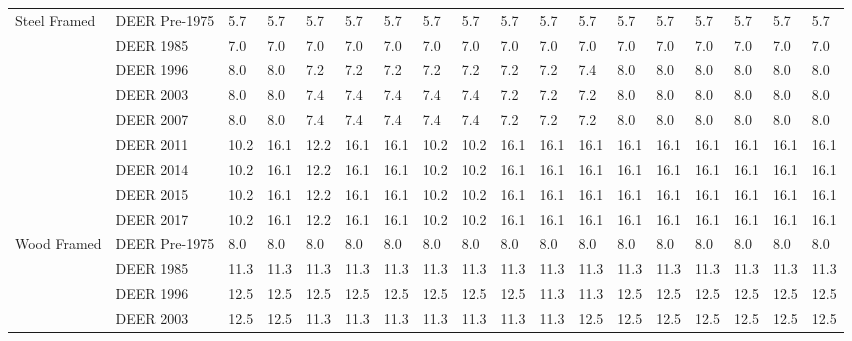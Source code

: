 \begin{table}
\begin{tabular}{p{0.4in}p{0.7in}p{0.1in}p{0.1in}p{0.1in}p{0.1in}p{0.1in}p{0.1in}p{0.1in}p{0.1in}p{0.1in}p{0.1in}p{0.1in}p{0.1in}p{0.1in}p{0.1in}p{0.1in}p{0.1in}}
Steel Framed & DEER Pre-1975 & 5.7  & 5.7  & 5.7  & 5.7  & 5.7  & 5.7  & 5.7  & 5.7  & 5.7  & 5.7  & 5.7  & 5.7  & 5.7  & 5.7  & 5.7  & 5.7                     \\
            & DEER 1985     & 7.0  & 7.0  & 7.0  & 7.0  & 7.0  & 7.0  & 7.0  & 7.0  & 7.0  & 7.0  & 7.0  & 7.0  & 7.0  & 7.0  & 7.0  & 7.0                     \\
            & DEER 1996     & 8.0  & 8.0  & 7.2  & 7.2  & 7.2  & 7.2  & 7.2  & 7.2  & 7.2  & 7.4  & 8.0  & 8.0  & 8.0  & 8.0  & 8.0  & 8.0                     \\
            & DEER 2003     & 8.0  & 8.0  & 7.4  & 7.4  & 7.4  & 7.4  & 7.4  & 7.2  & 7.2  & 7.2  & 8.0  & 8.0  & 8.0  & 8.0  & 8.0  & 8.0                     \\
            & DEER 2007     & 8.0  & 8.0  & 7.4  & 7.4  & 7.4  & 7.4  & 7.4  & 7.2  & 7.2  & 7.2  & 8.0  & 8.0  & 8.0  & 8.0  & 8.0  & 8.0                     \\
            & DEER 2011     & 10.2 & 16.1 & 12.2 & 16.1 & 16.1 & 10.2 & 10.2 & 16.1 & 16.1 & 16.1 & 16.1 & 16.1 & 16.1 & 16.1 & 16.1 & 16.1                    \\
            & DEER 2014     & 10.2 & 16.1 & 12.2 & 16.1 & 16.1 & 10.2 & 10.2 & 16.1 & 16.1 & 16.1 & 16.1 & 16.1 & 16.1 & 16.1 & 16.1 & 16.1                    \\
            & DEER 2015     & 10.2 & 16.1 & 12.2 & 16.1 & 16.1 & 10.2 & 10.2 & 16.1 & 16.1 & 16.1 & 16.1 & 16.1 & 16.1 & 16.1 & 16.1 & 16.1                    \\
            & DEER 2017     & 10.2 & 16.1 & 12.2 & 16.1 & 16.1 & 10.2 & 10.2 & 16.1 & 16.1 & 16.1 & 16.1 & 16.1 & 16.1 & 16.1 & 16.1 & 16.1                    \\
Wood Framed  & DEER Pre-1975 & 8.0  & 8.0  & 8.0  & 8.0  & 8.0  & 8.0  & 8.0  & 8.0  & 8.0  & 8.0  & 8.0  & 8.0  & 8.0  & 8.0  & 8.0  & 8.0                     \\
            & DEER 1985     & 11.3 & 11.3 & 11.3 & 11.3 & 11.3 & 11.3 & 11.3 & 11.3 & 11.3 & 11.3 & 11.3 & 11.3 & 11.3 & 11.3 & 11.3 & 11.3                    \\
            & DEER 1996     & 12.5 & 12.5 & 12.5 & 12.5 & 12.5 & 12.5 & 12.5 & 12.5 & 11.3 & 11.3 & 12.5 & 12.5 & 12.5 & 12.5 & 12.5 & 12.5                    \\
            & DEER 2003     & 12.5 & 12.5 & 11.3 & 11.3 & 11.3 & 11.3 & 11.3 & 11.3 & 11.3 & 12.5 & 12.5 & 12.5 & 12.5 & 12.5 & 12.5 & 12.5                    \\

\end{tabular}
\end{table}
